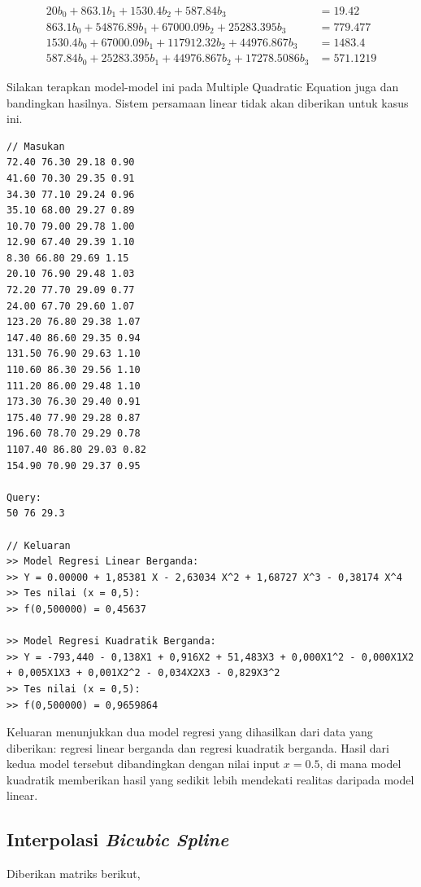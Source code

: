 \begin{align*}
    20b_0 + 863.1b_1 + 1530.4b_2 + 587.84b_3 &= 19.42 \\
    863.1b_0 + 54876.89b_1 + 67000.09b_2 + 25283.395b_3 &= 779.477 \\
    1530.4b_0 + 67000.09b_1 + 117912.32b_2 + 44976.867b_3 &= 1483.4 \\
    587.84b_0 + 25283.395b_1 + 44976.867b_2 + 17278.5086b_3 &= 571.1219
\end{align*}

Silakan terapkan model-model ini pada Multiple Quadratic Equation juga dan bandingkan hasilnya. Sistem persamaan linear tidak akan diberikan untuk kasus ini.


\begin{lstlisting}[caption = interpol-c.txt]
// Masukan
72.40 76.30 29.18 0.90
41.60 70.30 29.35 0.91
34.30 77.10 29.24 0.96
35.10 68.00 29.27 0.89
10.70 79.00 29.78 1.00
12.90 67.40 29.39 1.10
8.30 66.80 29.69 1.15
20.10 76.90 29.48 1.03
72.20 77.70 29.09 0.77
24.00 67.70 29.60 1.07
123.20 76.80 29.38 1.07
147.40 86.60 29.35 0.94
131.50 76.90 29.63 1.10
110.60 86.30 29.56 1.10
111.20 86.00 29.48 1.10
173.30 76.30 29.40 0.91
175.40 77.90 29.28 0.87
196.60 78.70 29.29 0.78
1107.40 86.80 29.03 0.82
154.90 70.90 29.37 0.95

Query:
50 76 29.3

// Keluaran
>> Model Regresi Linear Berganda:
>> Y = 0.00000 + 1,85381 X - 2,63034 X^2 + 1,68727 X^3 - 0,38174 X^4 
>> Tes nilai (x = 0,5):
>> f(0,500000) = 0,45637

>> Model Regresi Kuadratik Berganda:
>> Y = -793,440 - 0,138X1 + 0,916X2 + 51,483X3 + 0,000X1^2 - 0,000X1X2 + 0,005X1X3 + 0,001X2^2 - 0,034X2X3 - 0,829X3^2 
>> Tes nilai (x = 0,5):
>> f(0,500000) = 0,9659864\end{lstlisting}

Keluaran menunjukkan dua model regresi yang dihasilkan dari data yang diberikan: regresi linear berganda dan regresi kuadratik berganda. Hasil dari kedua model tersebut dibandingkan dengan nilai input \( x = 0.5 \), di mana model kuadratik memberikan hasil yang sedikit lebih mendekati realitas daripada model linear.
    
\pagebreak
\subsection{Interpolasi \textit{Bicubic Spline}}

Diberikan matriks berikut,\\

